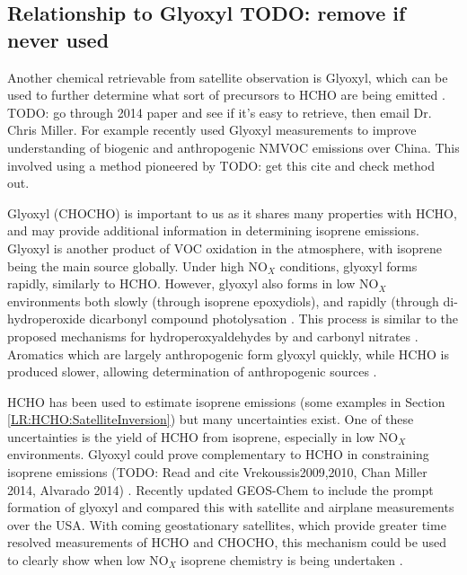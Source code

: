   \subsection{Relationship to Glyoxyl TODO: remove if never used}
    
    Another chemical retrievable from satellite observation is Glyoxyl, which can be used to further determine what sort of precursors to HCHO are being emitted \parencite{Stavrakou2009, Miller2014, Miller2017}.
    TODO: go through 2014 paper and see if it's easy to retrieve, then email Dr. Chris Miller.
    For example \cite{Cao2018_discuss} recently used Glyoxyl measurements to improve understanding of biogenic and anthropogenic NMVOC emissions over China.
    This involved using a method pioneered by \cite{Stavrakou2009} TODO: get this cite and check method out.
    
    Glyoxyl (CHOCHO) is important to us as it shares many properties with HCHO, and may provide additional information in determining isoprene emissions.
    Glyoxyl is another product of VOC oxidation in the atmosphere, with isoprene being the main source globally.
    Under high NO$_X$ conditions, glyoxyl forms rapidly, similarly to HCHO.
    However, glyoxyl also forms in low NO$_X$ environments both slowly (through isoprene epoxydiols), and rapidly (through di-hydroperoxide dicarbonyl compound photolysation \parencite{Crounse2013}.
    This process is similar to the proposed mechanisms for hydroperoxyaldehydes by \cite{Peeters2014} and carbonyl nitrates \parencite{Muller2014}.
    Aromatics which are largely anthropogenic form glyoxyl quickly, while HCHO is produced slower, allowing determination of anthropogenic sources \parencite{Cao2018_discuss}.
    
    HCHO has been used to estimate isoprene emissions (some examples in Section \ref{LR:HCHO:SatelliteInversion}) but many uncertainties exist.
    One of these uncertainties is the yield of HCHO from isoprene, especially in low NO$_X$ environments.
    Glyoxyl could prove complementary to HCHO in constraining isoprene emissions (TODO: Read and cite Vrekoussis2009,2010, Chan Miller 2014, Alvarado 2014) \parencite{Miller2017}.
    Recently \cite{Miller2017} updated GEOS-Chem to include the prompt formation of glyoxyl and compared this with satellite and airplane measurements over the USA.
    With coming geostationary satellites, which provide greater time resolved measurements of HCHO and CHOCHO, this mechanism could be used to clearly show when low NO$_X$ isoprene chemistry is being undertaken \parencite{Miller2017}.
    
